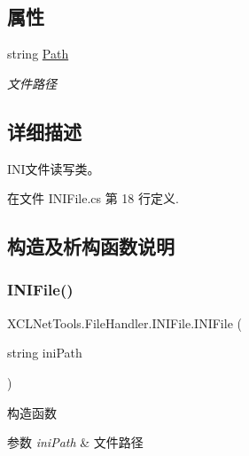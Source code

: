 \subsection*{属性}
\begin{DoxyCompactItemize}
\item 
string \hyperlink{class_x_c_l_net_tools_1_1_file_handler_1_1_i_n_i_file_ad8bccd635c5a32593aed15ee99671d67}{Path}
\begin{DoxyCompactList}\small\item\em 文件路径 \end{DoxyCompactList}\end{DoxyCompactItemize}


\subsection{详细描述}
I\+N\+I文件读写类。 



在文件 I\+N\+I\+File.\+cs 第 18 行定义.



\subsection{构造及析构函数说明}
\mbox{\label{class_x_c_l_net_tools_1_1_file_handler_1_1_i_n_i_file_a2a9b574a2a6b3d747e388d555daa674a}} 
\subsubsection{\texorpdfstring{I\+N\+I\+File()}{INIFile()}}
{\footnotesize\ttfamily X\+C\+L\+Net\+Tools.\+File\+Handler.\+I\+N\+I\+File.\+I\+N\+I\+File (\begin{DoxyParamCaption}\item[{string}]{ini\+Path }\end{DoxyParamCaption})}



构造函数 


\begin{DoxyParams}{参数}
{\em ini\+Path} & 文件路径\\
\hline
\end{DoxyParams}


